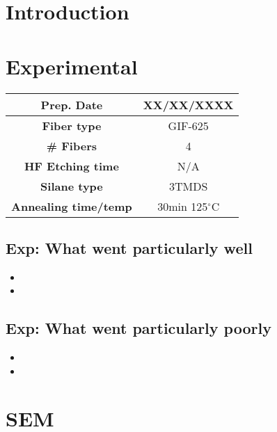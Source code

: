 \section{Introduction}

\section{Experimental}


\begin{center}
\begin{tabular}{| c | c |}
 \hline
 {\bf Prep. Date} & XX/XX/XXXX \\ \hline
 {\bf Fiber type} & GIF-625 \\ \hline
 {\bf \# Fibers} & 4  \\ \hline
 {\bf HF Etching time} & N/A \\ \hline
 {\bf Silane type} & 3TMDS \\ \hline
 {\bf Annealing time/temp} & 30min 125$^\circ$C  \\ \hline
\end{tabular}
\end{center}

\vspace{.3cm}


\subsection{Exp: {\color{blue} What went particularly well}}

\begin{itemize}
\item{}
\item{}
\end{itemize}

\subsection{Exp: {\color{red} What went particularly poorly}}

\begin{itemize}
\item{}
\item{}
\end{itemize}

\section{SEM}

